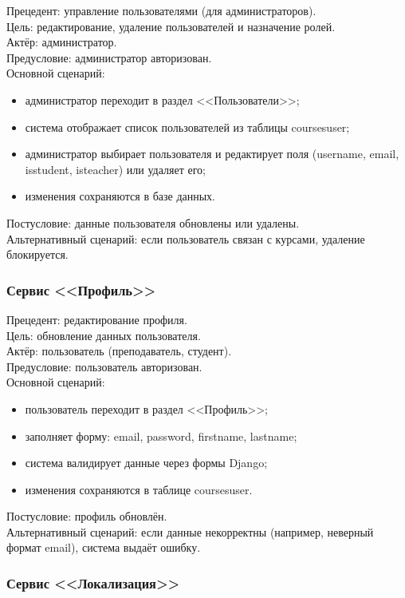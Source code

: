 {Прецедент: управление пользователями (для администраторов)}. \\
{Цель}: редактирование, удаление пользователей и назначение ролей. \\
{Актёр}: администратор. \\
{Предусловие}: администратор авторизован. \\
{Основной сценарий}:
\begin{itemize}
	\item администратор переходит в раздел <<Пользователи>>;
	\item система отображает список пользователей из таблицы coursesuser;
	\item администратор выбирает пользователя и редактирует поля (username, email, isstudent, isteacher) или удаляет его;
	\item изменения сохраняются в базе данных.
\end{itemize}
{Постусловие}: данные пользователя обновлены или удалены. \\
{Альтернативный сценарий}: если пользователь связан с курсами, удаление блокируется.

\subsubsection{Сервис <<Профиль>>}

{Прецедент: редактирование профиля}. \\
{Цель}: обновление данных пользователя. \\
{Актёр}: пользователь (преподаватель, студент). \\
{Предусловие}: пользователь авторизован. \\
{Основной сценарий}:
\begin{itemize}
	\item пользователь переходит в раздел <<Профиль>>;
	\item заполняет форму: email, password, firstname, lastname;
	\item система валидирует данные через формы Django;
	\item изменения сохраняются в таблице coursesuser.
\end{itemize}
{Постусловие}: профиль обновлён. \\
{Альтернативный сценарий}: если данные некорректны (например, неверный формат email), система выдаёт ошибку.

\subsubsection{Сервис <<Локализация>>}

